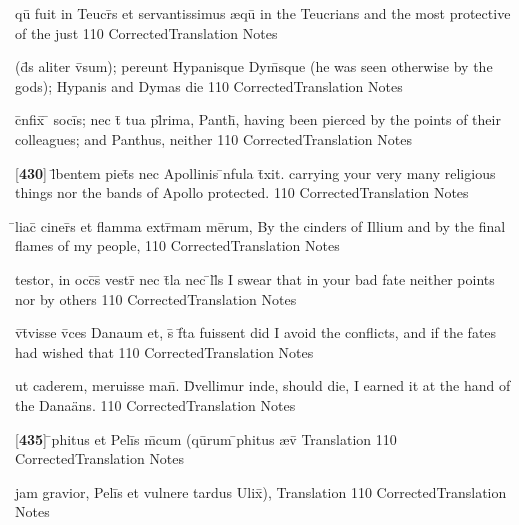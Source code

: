 \latline
  {qu\={\macron {\i}} fuit in Teucr\={\macron {\i}}s et servantissimus {\ae}qu\={\macron {\i}}}
  { in the Teucrians and the most protective of the just  }
  {110}
  { CorrectedTranslation }
  { Notes }


\latline
  {(d\={\macron {\i}}s aliter v\={\macron {\i}}sum); pereunt Hypanisque Dym\={}sque}
  { (he was seen otherwise by the gods); Hypanis and Dymas die }
  {110}
  { CorrectedTranslation }
  { Notes }


\latline
  {c\={}nfix\={\macron {\i}} \={} soci\={\macron {\i}}s; nec t\={} tua pl\={}rima, Panth\={},}
  { having been pierced by the points of their colleagues; and Panthus, neither  }
  {110}
  { CorrectedTranslation }
  { Notes }


\latline
  {[\textbf{430}] l\={}bentem piet\={}s nec Apollinis \={\macron {\i}}nfula t\={}xit.}
  { carrying your very many religious things nor the bands of Apollo protected. }
  {110}
  { CorrectedTranslation }
  { Notes }


\latline
  {\={}liac\={\macron {\i}} ciner\={}s et flamma extr\={}mam me\={}rum,}
  { By the cinders of Illium and by the final flames of my people, }
  {110}
  { CorrectedTranslation }
  { Notes }


\latline
  {testor, in occ\={}s\={} vestr\={} nec t\={}la nec \={}ll\={}s}
  { I swear that in your bad fate neither points nor by others  }
  {110}
  { CorrectedTranslation }
  { Notes }


\latline
  {v\={\macron {\i}}t\={}visse v\={\macron {\i}}ces Danaum et, s\={\macron {\i}} f\={}ta fuissent}
  { did I avoid the conflicts, and if the fates had wished that   }
  {110}
  { CorrectedTranslation }
  { Notes }


\latline
  {ut caderem, meruisse man\={}.  D\={\macron {\i}}vellimur inde,}
  { should die, I earned it at the hand of the Dana\"ans. }
  {110}
  { CorrectedTranslation }
  { Notes }


\latline
  {[\textbf{435}] \={}phitus et Peli\={}s m\={}cum (qu\={}rum \={}phitus {\ae}v\={}}
  { Translation }
  {110}
  { CorrectedTranslation }
  { Notes }


\latline
  {jam gravior, Peli\={}s et vulnere tardus Ulix\={\macron {\i}}),}
  { Translation }
  {110}
  { CorrectedTranslation }
  { Notes }


